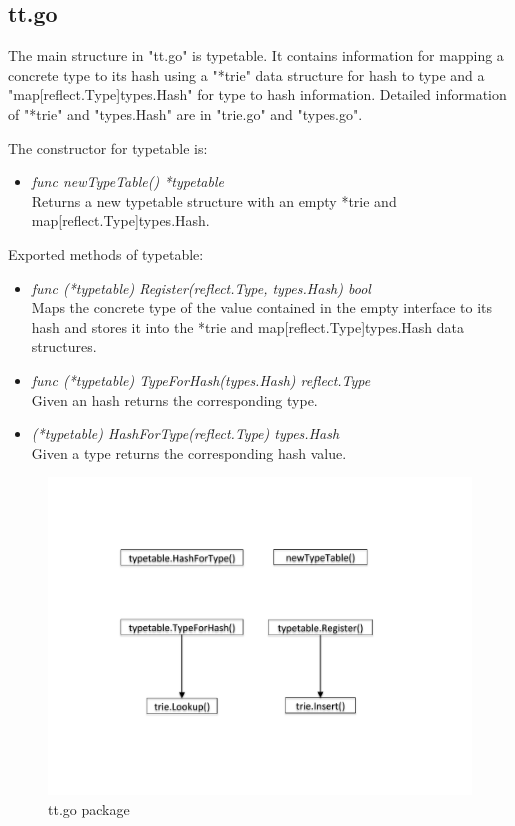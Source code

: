 \subsection{tt.go} 

The main structure in "tt.go" is typetable. It contains information for mapping a concrete type to its hash using a "*trie" data structure for hash to type and a "map[reflect.Type]types.Hash" for type to hash information. Detailed information of "*trie" and "types.Hash" are in "trie.go" and "types.go".

The constructor for typetable is:

\begin{itemize}

	\item \emph{func newTypeTable() *typetable}\\
	Returns a new typetable structure with an empty *trie and map[reflect.Type]types.Hash.
	
\end{itemize}

Exported methods of typetable:

\begin{itemize}

	\item \emph{func (*typetable) Register(reflect.Type, types.Hash) bool}\\
	Maps the concrete type of the value contained in the empty interface to its hash and stores it into the *trie and map[reflect.Type]types.Hash data structures.
	
	\item \emph{func (*typetable) TypeForHash(types.Hash) reflect.Type}\\
	Given an hash returns the corresponding type.
	
	\item \emph{(*typetable) HashForType(reflect.Type) types.Hash}\\
	Given a type returns the corresponding hash value.
	
\end{itemize}

\begin{figure}[H]
\centering
\includegraphics[scale=0.50]{callGraphs/ttPackage}
\caption{tt.go package}
\end{figure}